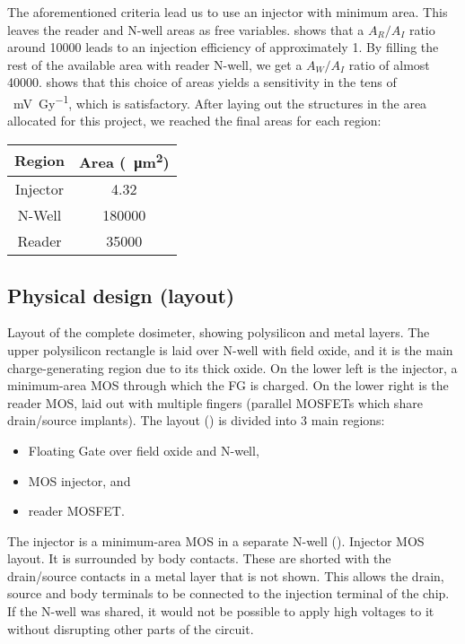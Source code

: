 {%
The aforementioned criteria lead us to use an injector with minimum area.
This leaves the reader and N-well areas as free variables.
shows that a $A_R/A_I$ ratio around 10000
leads to an injection efficiency of approximately 1.
By filling the rest of the available area with reader N-well,
we get a $A_W/A_I$ ratio of almost 40000.
 shows that this choice of areas
yields a sensitivity in the tens of \SI{}{\milli\volt\per\gray},
which is satisfactory.
After laying out the structures in the area allocated for this project,
we reached the final areas for each region:
\begin{table}[h]
\centering
\begin{tabular}{|c|c|}
    \hline
    Region   & Area (\SI{}{\micro\meter\squared})\\ \hline
    Injector \vspace{0.5cm}& 4.32\\
N-Well     & 180000\\
Reader   & 35000\\
\hline
\end{tabular}
\end{table}
%
\subsection{Physical design (layout)}
%
{Layout of the complete dosimeter, showing polysilicon and metal layers.
The upper polysilicon rectangle is laid over N-well with field oxide,
and it is the main charge-generating region due to its thick oxide.
On the lower left is the injector,
a minimum-area MOS through which the FG is charged.
On the lower right is the reader MOS, laid out with multiple fingers
(parallel MOSFETs which share drain/source implants).}
The layout () is divided into 3 main regions:
\begin{itemize}
    \item Floating Gate over field oxide and N-well,
    \item MOS injector, and
    \item reader MOSFET.
\end{itemize}
The injector is a minimum-area MOS in a separate N-well
().
{Injector MOS layout. It is surrounded by body contacts.
These are shorted with the drain/source contacts
in a metal layer that is not shown.  }
This allows the drain, source and body terminals to be connected to the injection terminal of the chip. If the N-well was shared, it would not be possible to apply high voltages to it without disrupting other parts of the circuit.

}
